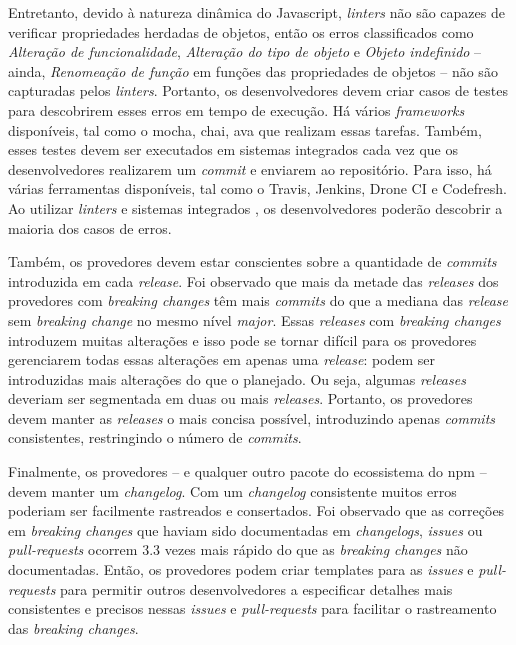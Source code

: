 Entretanto, devido à natureza dinâmica do \textsf{Javascript}, \textit{linters} não são capazes de verificar propriedades herdadas de objetos, então os erros classificados como \textit{Alteração de funcionalidade}, \textit{Alteração do tipo de objeto} e \textit{Objeto indefinido} -- ainda, \textit{Renomeação de função} em funções das propriedades de objetos -- não são capturadas pelos \textit{linters}. Portanto, os desenvolvedores devem criar casos de testes para descobrirem esses erros em tempo de execução. Há vários \textit{frameworks} disponíveis, tal como o \textsf{mocha}, \textsf{chai}, \textsf{ava} que realizam essas tarefas. Também, esses testes devem ser executados em sistemas integrados cada vez que os desenvolvedores realizarem um \textit{commit} e enviarem ao repositório. Para isso, há várias ferramentas disponíveis, tal como o \textsf{Travis}, \textsf{Jenkins}, \textsf{Drone CI} e \textsf{Codefresh}. Ao utilizar \textit{linters} e sistemas integrados , os desenvolvedores poderão descobrir a maioria dos casos de erros.

Também, os provedores devem estar conscientes sobre a quantidade de \textit{commits} introduzida em cada \textit{release}. Foi observado que mais da metade das \textit{releases} dos provedores com \textit{breaking changes} têm mais \textit{commits} do que a mediana das \textit{release} sem \textit{breaking change} no mesmo nível \textit{major}. Essas \textit{releases} com \textit{breaking changes} introduzem muitas alterações e isso pode se tornar difícil para os provedores gerenciarem todas essas alterações em apenas uma \textit{release}: podem ser introduzidas mais alterações do que o planejado. Ou seja, algumas \textit{releases} deveriam ser segmentada em duas ou mais \textit{releases}. Portanto, os provedores devem manter as \textit{releases} o mais concisa possível, introduzindo apenas \textit{commits} consistentes, restringindo o número de \textit{commits}.

Finalmente, os provedores -- e qualquer outro pacote do ecossistema do \textsf{npm} -- devem manter um \textit{changelog}. Com um \textit{changelog} consistente muitos erros poderiam ser facilmente rastreados e consertados. Foi observado que as correções em \textit{breaking changes} que haviam sido documentadas em \textit{changelogs}, \textit{issues} ou \textit{pull-requests} ocorrem 3.3 vezes mais rápido do que as \textit{breaking changes} não documentadas. Então, os provedores podem criar templates para as \textit{issues} e \textit{pull-requests} para permitir outros desenvolvedores a especificar detalhes mais consistentes e precisos nessas \textit{issues} e \textit{pull-requests} para facilitar o rastreamento das \textit{breaking changes}.

